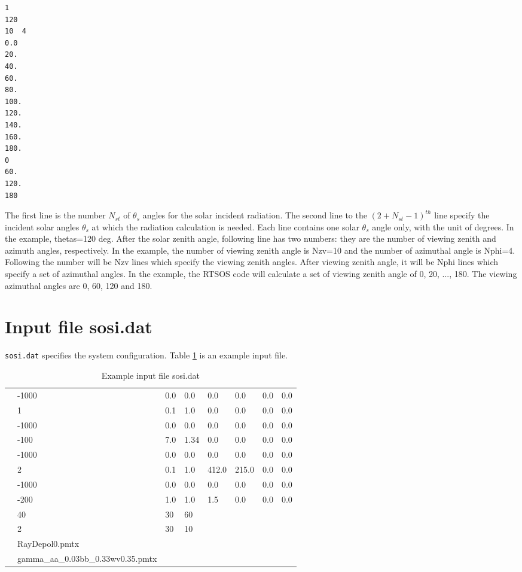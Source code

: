 \documentclass[10pt,letterpaper]{article}
\begin{document}
\begin{verbatim}
1
120
10  4
0.0
20.
40.
60.
80.
100.
120.
140.
160.
180. 
0
60.
120.
180
\end{verbatim}

The first line is the number $N_{st}$ of $\theta_{s}$ angles for the solar incident radiation.  The second line to the ${(2+N_{st}-1)}^{th}$ line specify the incident solar angles $\theta_{s}$ at which the radiation calculation is needed.  Each line contains one solar $\theta_{s}$ angle only, with the unit of degrees.  In the example, thetas=120 deg. After the solar zenith angle, following line has two numbers: they are the number of viewing zenith and azimuth angles, respectively.  In the example, the number of viewing zenith angle is Nzv=10 and the number of azimuthal angle is Nphi=4.  Following the number will be Nzv lines which specify the viewing zenith angles.  After viewing zenith angle, it will be Nphi lines which specify a set of azimuthal angles. In the example, the RTSOS code will calculate a set of viewing zenith angle of 0, 20, ..., 180.  The viewing azimuthal angles are 0, 60, 120 and 180.

\section{Input file sosi.dat}
\verb"sosi.dat" specifies the system configuration.  Table \ref{tab:sosi} is an example input file.
\begin{table}
\caption{Example input file sosi.dat}
\vspace{0.2 in}
\centering
\begin{tabular}{llllllll}
&-1000 &  0.0  & 0.0   &  0.0   &  0.0    & 0.0   & 0.0   \\
&1        &  0.1  & 1.0   &  0.0   &  0.0    & 0.0   & 0.0   \\
&-1000 &  0.0  & 0.0   &  0.0   &  0.0    & 0.0   & 0.0   \\
&-100   &  7.0  & 1.34 &  0.0   &   0.0   & 0.0   & 0.0   \\
&-1000 &  0.0  & 0.0   &   0.0  &  0.0    & 0.0   & 0.0   \\
&2        &  0.1  & 1.0   & 412.0& 215.0 & 0.0   & 0.0   \\
&-1000 &  0.0  & 0.0   &   0.0  & 0.0     & 0.0   & 0.0   \\
&-200   &  1.0  & 1.0   &   1.5  &  0.0    & 0.0   & 0.0   \\
&40      &  30   & 60    &          &           &         &         \\
&2        &  30     & 10      &          &           &         &         \\
&RayDepol0.pmtx        &        &           & &     &     &               \\
&gamma\_aa\_0.03bb\_0.33wv0.35.pmtx    &       &    & &         &      &         \\
\end{tabular}
\label{tab:sosi}
\end{table}
\end{document}
